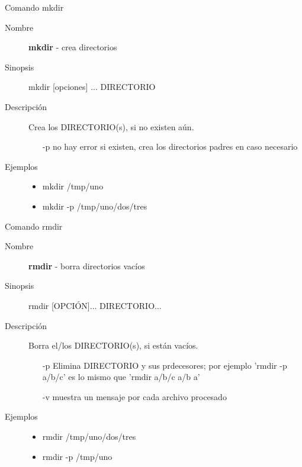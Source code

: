 \begin{frame}[c]{Comando mkdir}
  \begin{description}
    \item[Nombre]
      \textbf{mkdir} - crea directorios

    \vspace{\baselineskip}
    \item[Sinopsis]
      mkdir [opciones] ... DIRECTORIO

    \vspace{\baselineskip}
    \item[Descripción]
      Crea los DIRECTORIO(s), si no existen aún.

      \begin{itemize}
        \item [-p] no hay error si existen, crea los directorios
          padres en caso necesario
      \end{itemize}

    \vspace{\baselineskip}
    \item[Ejemplos]
      \begin{itemize}
        \item mkdir /tmp/uno
        \item mkdir -p /tmp/uno/dos/tres
      \end{itemize}
  \end{description}
\end{frame}

\begin{frame}[c]{Comando rmdir}
  \begin{description}
    \item[Nombre]
      \textbf{rmdir} - borra directorios vacíos

    \vspace{\baselineskip}
    \item[Sinopsis]
        rmdir [OPCIÓN]... DIRECTORIO...

    \vspace{\baselineskip}
    \item[Descripción]
      Borra el/los DIRECTORIO(s), si están vacíos.

      \begin{itemize}
        \item [-p] Elimina DIRECTORIO y sus prdecesores; por ejemplo
          'rmdir -p a/b/c' es lo mismo que 'rmdir a/b/c a/b a'
        \item [-v] muestra un mensaje por cada archivo procesado
      \end{itemize}

    \vspace{\baselineskip}
    \item[Ejemplos]
      \begin{itemize}
        \item rmdir /tmp/uno/dos/tres
        \item rmdir -p /tmp/uno
      \end{itemize}
  \end{description}
\end{frame}

